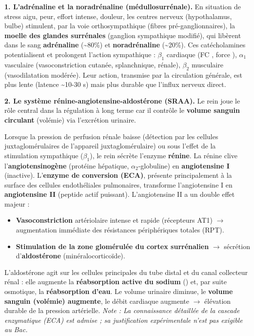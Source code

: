 \documentclass[11pt]{article}
\begin{document}
\textbf{1. L'adrénaline et la noradrénaline (médullosurrénale).} En situation de stress aigu, peur, effort intense, douleur, les centres nerveux (hypothalamus, bulbe) stimulent, par la voie orthosympathique (fibres pré-ganglionnaires), la \textbf{moelle des glandes surrénales} (ganglion sympathique modifié), qui libèrent dans le sang \textbf{adrénaline} (\textasciitilde 80\%) et \textbf{noradrénaline} (\textasciitilde 20\%). Ces catécholamines potentialisent et prolongent l'action sympathique : $\beta_1$ cardiaque (FC \textuparrow, force \textuparrow), $\alpha_1$ vasculaire (vasoconstriction cutanée, splanchnique, rénale), $\beta_2$ musculaire (vasodilatation modérée). Leur action, transmise par la circulation générale, est plus lente (latence \textasciitilde 10-30 s) mais plus durable que l'influx nerveux direct.

\textbf{2. Le système rénine-angiotensine-aldostérone (SRAA).} Le rein joue le rôle central dans la régulation à long terme car il contrôle le \textbf{volume sanguin circulant} (volémie) via l'excrétion urinaire.

\begin{propriete}
Lorsque la pression de perfusion rénale baisse (détection par les cellules juxtaglomérulaires de l'appareil juxtaglomérulaire) ou sous l'effet de la stimulation sympathique ($\beta_1$), le rein sécrète l'enzyme \textbf{rénine}. La rénine clive l'\textbf{angiotensinogène} (protéine hépatique, $\alpha_2$-globuline) en \textbf{angiotensine I} (inactive). L'\textbf{enzyme de conversion (ECA)}, présente principalement à la surface des cellules endothéliales pulmonaires, transforme l'angiotensine I en \textbf{angiotensine II} (peptide actif puissant).
L'angiotensine II a un double effet majeur :
\begin{itemize}
\item \textbf{Vasoconstriction} artériolaire intense et rapide (récepteurs AT1) $\rightarrow$ augmentation immédiate des résistances périphériques totales (RPT).
\item \textbf{Stimulation de la zone glomérulée du cortex surrénalien} $\rightarrow$ sécrétion d'\textbf{aldostérone} (minéralocorticoïde).
\end{itemize}
L'aldostérone agit sur les cellules principales du tube distal et du canal collecteur rénal : elle augmente la \textbf{réabsorption active du sodium} () et, par suite osmotique, la \textbf{réabsorption d'eau}. Le volume urinaire diminue, le \textbf{volume sanguin (volémie) augmente}, le débit cardiaque augmente $\rightarrow$ élévation durable de la pression artérielle.
\textit{Note : La connaissance détaillée de la cascade enzymatique (ECA) est admise ; sa justification expérimentale n'est pas exigible au Bac.}
\end{propriete}
\end{document}
